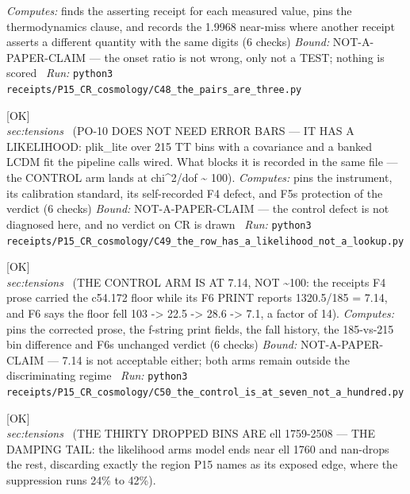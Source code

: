 \begin{description}
\emph{Computes:} finds the asserting receipt for each measured value, pins the thermodynamics clause, and records the 1.9968 near-miss where another receipt asserts a different quantity with the same digits (6 checks)
 \emph{Bound:} NOT-A-PAPER-CLAIM --- the onset ratio is not wrong, only not a TEST; nothing is scored
\ \emph{Run:} \texttt{python3 receipts/P15\_CR\_cosmology/C48\_the\_pairs\_are\_three.py}
\item[\label{rcpt:C49_the_row_has_a_likelihood_not_a_lookup}\texttt{C49\_the\_row\_has\_a\_likelihood\_not\_a\_lookup}]\hfill\textsf{[OK]}\\
\textit{sec:tensions} \ (PO-10 DOES NOT NEED ERROR BARS --- IT HAS A LIKELIHOOD: plik\_lite over 215 TT bins with a covariance and a banked LCDM fit the pipeline calls wired. What blocks it is recorded in the same file --- the CONTROL arm lands at chi\textasciicircum{}2/dof \textasciitilde{} 100). 
\emph{Computes:} pins the instrument, its calibration standard, its self-recorded F4 defect, and F5s protection of the verdict (6 checks)
 \emph{Bound:} NOT-A-PAPER-CLAIM --- the control defect is not diagnosed here, and no verdict on CR is drawn
\ \emph{Run:} \texttt{python3 receipts/P15\_CR\_cosmology/C49\_the\_row\_has\_a\_likelihood\_not\_a\_lookup.py}
\item[\label{rcpt:C50_the_control_is_at_seven_not_a_hundred}\texttt{C50\_the\_control\_is\_at\_seven\_not\_a\_hundred}]\hfill\textsf{[OK]}\\
\textit{sec:tensions} \ (THE CONTROL ARM IS AT 7.14, NOT \textasciitilde{}100: the receipts F4 prose carried the c54.172 floor while its F6 PRINT reports 1320.5/185 = 7.14, and F6 says the floor fell 103 -> 22.5 -> 28.6 -> 7.1, a factor of 14). 
\emph{Computes:} pins the corrected prose, the f-string print fields, the fall history, the 185-vs-215 bin difference and F6s unchanged verdict (6 checks)
 \emph{Bound:} NOT-A-PAPER-CLAIM --- 7.14 is not acceptable either; both arms remain outside the discriminating regime
\ \emph{Run:} \texttt{python3 receipts/P15\_CR\_cosmology/C50\_the\_control\_is\_at\_seven\_not\_a\_hundred.py}
\item[\label{rcpt:C51_the_dropped_bins_are_the_damping_tail}\texttt{C51\_the\_dropped\_bins\_are\_the\_damping\_tail}]\hfill\textsf{[OK]}\\
\textit{sec:tensions} \ (THE THIRTY DROPPED BINS ARE ell 1759-2508 --- THE DAMPING TAIL: the likelihood arms model ends near ell 1760 and nan-drops the rest, discarding exactly the region P15 names as its exposed edge, where the suppression runs 24\% to 42\%). 

\end{description}
